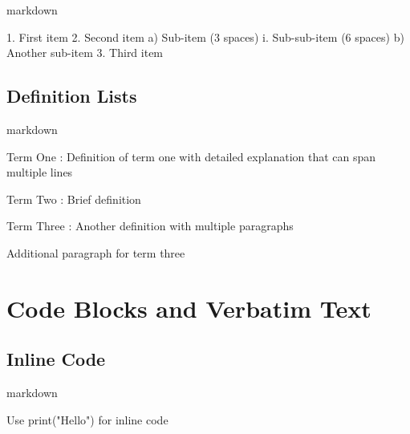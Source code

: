 \documentclass[
  11pt,
  letterpaper,
]{book}
\newenvironment{Shaded}{\begin{snugshade}}{\end{snugshade}}
\newcommand{\InformationTok}[1]{\textcolor[rgb]{0.37,0.37,0.37}{#1}}
\newcommand{\NormalTok}[1]{\textcolor[rgb]{0.00,0.23,0.31}{#1}}
\newcommand{\SpecialStringTok}[1]{\textcolor[rgb]{0.13,0.47,0.30}{#1}}
\begin{document}
markdown

\begin{Shaded}
\begin{Highlighting}[]
\SpecialStringTok{1. }\NormalTok{First item}
\SpecialStringTok{2. }\NormalTok{Second item}
\NormalTok{   a) Sub{-}item (3 spaces)}
\NormalTok{      i. Sub{-}sub{-}item (6 spaces)}
\NormalTok{   b) Another sub{-}item}
\SpecialStringTok{3. }\NormalTok{Third item}
\end{Highlighting}
\end{Shaded}

\subsection*{Definition Lists}\label{definition-lists}

markdown

\begin{Shaded}
\begin{Highlighting}[]
\NormalTok{Term One}
\NormalTok{: Definition of term one with detailed explanation}
\NormalTok{  that can span multiple lines}

\NormalTok{Term Two}
\NormalTok{: Brief definition}

\NormalTok{Term Three}
\NormalTok{: Another definition with multiple paragraphs}

\NormalTok{  Additional paragraph for term three}
\end{Highlighting}
\end{Shaded}

\section*{Code Blocks and Verbatim
Text}\label{code-blocks-and-verbatim-text}


\subsection*{Inline Code}\label{inline-code}

markdown

\begin{Shaded}
\begin{Highlighting}[]
\NormalTok{Use }\InformationTok{\textasciigrave{}print("Hello")\textasciigrave{}}\NormalTok{ for inline code}
\end{Highlighting}
\end{Shaded}
\end{document}
